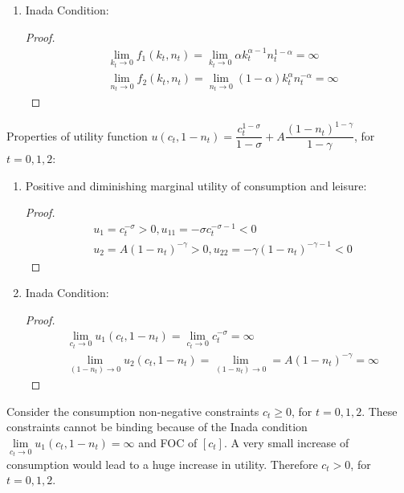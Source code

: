 \documentclass{article}
\begin{document}
\begin{enumerate}
\begin{enumerate}
\begin{enumerate}
\begin{proof}
\begin{align*}
                    &f_2=(1-\alpha)k_t^{\alpha}n_t^{-\alpha}>0,f_{22}=-\alpha(1-\alpha)k_t^{\alpha}n_t^{-\alpha-1}<0
                \end{align*}
            \end{proof}
            \item Inada Condition:
            \begin{proof}
                \begin{align*}
                    &\lim_{k_t\to0}f_1(k_t,n_t)=\lim_{k_t\to0}\alpha k_t^{\alpha-1}n_t^{1-\alpha}=\infty\\
                    &\lim_{n_t\to0}f_2(k_t,n_t)=\lim_{n_t\to0}(1-\alpha)k_t^{\alpha}n_t^{-\alpha}=\infty
                \end{align*}
            \end{proof}
        \end{enumerate}
        Properties of utility function $u(c_t,1-n_t)=\dfrac{c_t^{1-\sigma}}{1-\sigma}+A\dfrac{(1-n_t)^{1-\gamma}}{1-\gamma}$, for $t=0,1,2$:
        \begin{enumerate}
            \item Positive and diminishing marginal utility of consumption and leisure:
            \begin{proof}
                \begin{align*}
                    &u_1=c_t^{-\sigma}>0,u_{11}=-\sigma c_t^{-\sigma-1}<0\\
                    &u_2=A(1-n_t)^{-\gamma}>0,u_{22}=-\gamma(1-n_t)^{-\gamma-1}<0
                \end{align*}
            \end{proof}
            \item Inada Condition:
            \begin{proof}
                \begin{align*}
                    &\lim_{c_t\to0}u_1(c_t,1-n_t)=\lim_{c_t\to0}c_t^{-\sigma}=\infty\\
                    &\lim_{(1-n_t)\to0}u_2(c_t,1-n_t)=\lim_{(1-n_t)\to0}=A(1-n_t)^{-\gamma}=\infty
                \end{align*}
            \end{proof}
        \end{enumerate}
        Consider the consumption non-negative constraints $c_t\ge0$, for $t=0,1,2$. These constraints cannot be binding because of the Inada condition $\lim\limits_{c_t\to0}u_1(c_t,1-n_t)=\infty$ and FOC of \([c_t]\).
        A very small increase of consumption would lead to a huge increase in utility. Therefore $c_t>0$, for $t=0,1,2$.

\end{enumerate}
\end{enumerate}
\end{document}
